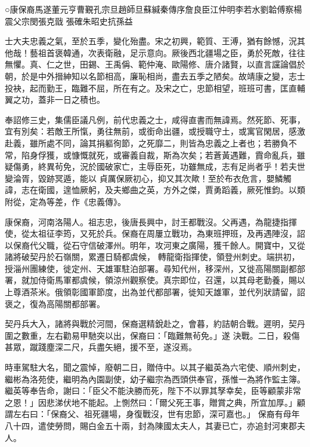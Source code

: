 
\begin{pinyinscope}

 ○康保裔馬遂董元亨曹覲孔宗旦趙師旦蘇緘秦傳序詹良臣江仲明李若水劉韐傅察楊震父宗閔張克戩
 張確朱昭史抗孫益



 士大夫忠義之氣，至於五季，變化殆盡。宋之初興，範質、王溥，猶有餘憾，況其他哉！藝祖首褒韓通，次表衛融，足示意向。厥後西北疆場之臣，勇於死敵，往往無懼。真、仁之世，田錫、王禹偁、範仲淹、歐陽修、唐介諸賢，以直言讜論倡於朝，於是中外搢紳知以名節相高，廉恥相尚，盡去五季之陋矣。故靖康之變，志士投袂，起而勤王，臨難不屈，所在有之。及宋之亡，忠節相望，班班可書，匡直輔
 翼之功，蓋非一日之積也。



 奉詔修三史，集儒臣議凡例，前代忠義之士，咸得直書而無諱焉。然死節、死事，宜有別矣：若敵王所愾，勇往無前，或銜命出疆，或授職守土，或寓官閑居，感激赴義，雖所處不同，論其捐軀徇節，之死靡二，則皆為忠義之上者也；若勝負不常，陷身俘獲，或慷慨就死，或審義自裁，斯為次矣；若蒼黃遇難，霣命亂兵，雖疑傷勇，終異茍免，況於國破家亡，主辱臣死，功雖無成，志有足尚者乎！若夫世變淪胥，毀跡冥遁，能以
 貞厲保厥初心，抑又其次歟！至於布衣危言，嬰鱗觸諱，志在衛國，遑恤厥躬，及夫鄉曲之英，方外之傑，賈勇蹈義，厥死惟鈞。以類附從，定為等差，作《忠義傳》。



 康保裔，河南洛陽人。祖志忠，後唐長興中，討王都戰沒。父再遇，為龍捷指揮使，從太祖征李筠，又死於兵。保裔在周屢立戰功，為東班押班，及再遇陣沒，詔以保裔代父職，從石守信破澤州。明年，攻河東之廣陽，獲千餘人。開寶中，又從諸將破契丹於石嶺關，累遷日騎都虞候，
 轉龍衛指揮使，領登州刺史。端拱初，授淄州團練使，徙定州、天雄軍駐泊部署。尋知代州，移深州，又徙高陽關副都部署，就加侍衛馬軍都虞候，領涼州觀察使。真宗即位，召還，以其母老勤養，賜以上尊酒茶米。俄領彰國軍節度，出為並代都部署，徙知天雄軍，並代列狀請留，詔褒之，復為高陽關都部署。



 契丹兵大入，諸將與戰於河間，保裔選精銳赴之，會暮，約詰朝合戰。遲明，契丹圍之數重，左右勸易甲馳突以出，保裔曰：「臨難無茍免。」遂
 決戰。二日，殺傷甚眾，蹴踐塵深二尺，兵盡矢絕，援不至，遂沒焉。



 時車駕駐大名，聞之震悼，廢朝二日，贈侍中。以其子繼英為六宅使、順州刺史，繼彬為洛苑使，繼明為內園副使，幼子繼宗為西頭供奉官，孫惟一為將作監主簿。繼英等奉告命，謝曰：「臣父不能決勝而死，陛下不以罪其孥幸矣，臣等顧蒙非常之恩！」因悲涕伏地不能起。上惻然曰：「爾父死王事，贈賞之典，所宜加厚。」顧謂左右曰：「保裔父、祖死疆場，身復戰沒，世有忠節，深可嘉也。」
 保裔有母年八十四，遣使勞問，賜白金五十兩，封為陳國太夫人，其妻已亡，亦追封河東郡夫人。




\end{pinyinscope}
